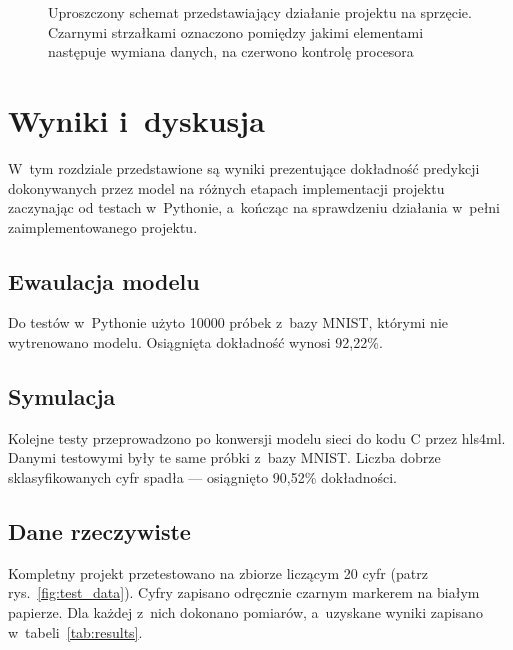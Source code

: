 \documentclass[12pt, oneside, a4paper]{article}
\def\CPP{{C\nolinebreak[4]\hspace{-.05em}\raisebox{.4ex}{\tiny\bf ++}}}
\begin{document}
\begin{figure}[h]
  \centering
  
  \caption{Uproszczony schemat przedstawiający działanie
  projektu na sprzęcie.
  Czarnymi strzałkami oznaczono pomiędzy jakimi elementami
  następuje wymiana danych, na czerwono kontrolę procesora}\label{fig:physical-scheme}
\end{figure}

\newpage
\begin{minipage}{\linewidth}

\end{minipage}


\newpage
\section{Wyniki i~dyskusja}\label{sec:Wyniki i~dyskusja}
W~tym rozdziale przedstawione są wyniki prezentujące dokładność
predykcji dokonywanych przez model na różnych etapach implementacji
projektu zaczynając od testach w~Pythonie, a~kończąc na sprawdzeniu
działania w~pełni zaimplementowanego projektu.

\subsection{Ewaulacja modelu}\label{sec:Ewaulacja modelu}
Do testów w~Pythonie użyto 10000 próbek z~bazy MNIST, którymi nie
wytrenowano modelu. Osiągnięta dokładność wynosi 92,22\%. 

\subsection{Symulacja}\label{sec:Symulacja}
Kolejne testy przeprowadzono po konwersji modelu sieci do kodu \CPP{}
przez hls4ml. Danymi testowymi były te same próbki z~bazy MNIST.
Liczba dobrze sklasyfikowanych cyfr spadła --- osiągnięto 90,52\%
dokładności.

\subsection{Dane rzeczywiste}\label{sec:Dane rzeczywiste}
Kompletny projekt przetestowano na zbiorze liczącym 20 cyfr (patrz
rys.~\ref{fig:test_data}). Cyfry
zapisano odręcznie czarnym markerem na białym papierze. Dla każdej z~nich
dokonano pomiarów, a~uzyskane wyniki zapisano w~tabeli~\ref{tab:results}.
\end{document}
